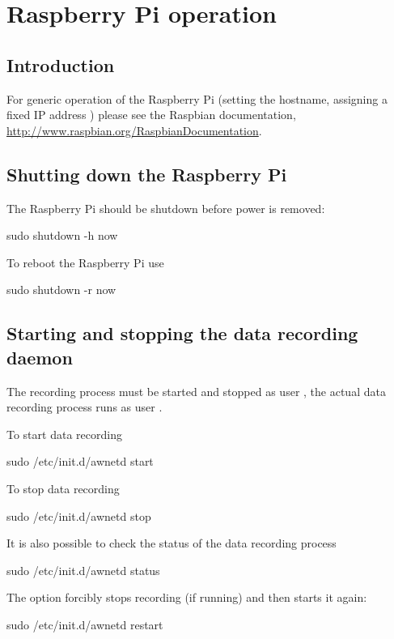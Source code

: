 \chapter{Raspberry Pi operation}

\section{Introduction}

For generic operation of the Raspberry Pi (setting the hostname,
assigning a fixed IP address \etc) please see the Raspbian
documentation,
\url{http://www.raspbian.org/RaspbianDocumentation}.

\section{Shutting down the Raspberry Pi}

The Raspberry Pi should be shutdown before power is removed:
\begin{Cmd}
sudo shutdown -h now
\end{Cmd}

To reboot the Raspberry Pi use
\begin{Cmd}
sudo shutdown -r now
\end{Cmd}

\section{Starting and stopping the data recording daemon}

The recording process must be started and stopped as user \rootUser,
the actual data recording process runs as user \piUser.


To start data recording
\begin{Cmd}
sudo /etc/init.d/awnetd start
\end{Cmd}

To stop data recording
\begin{Cmd}
sudo /etc/init.d/awnetd stop
\end{Cmd}

It is also possible to check the status of the data recording process
\begin{Cmd}
sudo /etc/init.d/awnetd status
\end{Cmd}

The  option forcibly stops recording (if running) and
then starts it again:
\begin{Cmd}
sudo /etc/init.d/awnetd restart
\end{Cmd}

